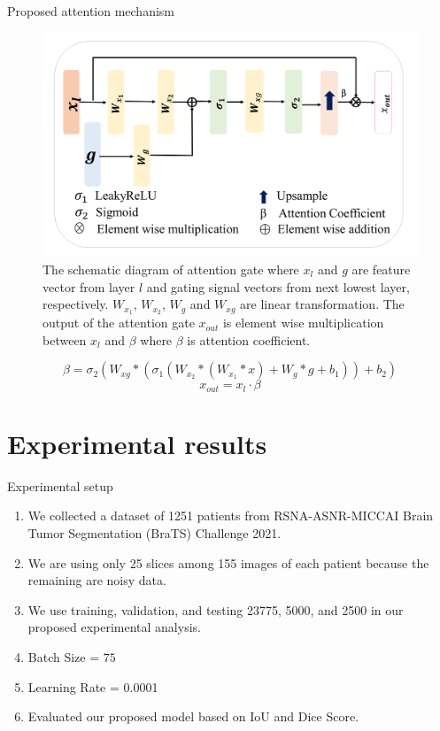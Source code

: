 \documentclass [xcolor=svgnames, t] {beamer}
\begin{document}
\begin{frame}{Proposed attention mechanism}
\vspace{-4mm}
\begin{figure}[H]
\includegraphics[width=0.7\linewidth]{attenton1.png}
\caption{\justifying The schematic diagram of attention gate where $x_l$ and $g$ are feature vector from layer $l$ and gating signal vectors from next lowest layer, respectively. $W_{x_1}$, $W_{x_2}$, $W_g$ and $W_{xg}$ are linear transformation. The output of the attention gate $x_{out}$ is element wise multiplication between $x_l$ and $\beta$ where $\beta$ is attention coefficient.}
\end{figure}
\vspace{-5mm}
\begin{equation}
\beta = \sigma_2(W_{xg} \ast (\sigma_1(W_{x_2} \ast (W_{x_1} \ast x) + W_g \ast g + b_1)) + b_2)
\label{eq2}
\end{equation}
\begin{equation}
x_{out} = x_l \cdot \beta
\end{equation}
\end{frame}

\section{Experimental results}
\begin{frame}{Experimental setup}
\vspace*{\fill}
    \begin{enumerate}
    \justifying
        \item We collected a dataset of 1251 patients from RSNA-ASNR-MICCAI Brain Tumor Segmentation (BraTS) Challenge 2021.
        \item We are using only 25 slices among 155 images of each patient because the remaining are noisy data.
        \item We use training, validation, and testing 23775, 5000, and 2500 in our proposed experimental analysis.
        \item Batch Size = $75$
        \item Learning Rate = 0.0001
        \item Evaluated our proposed model based on IoU and Dice Score.
   \end{enumerate}
    \vspace*{\fill}
\end{frame}
\end{document}
